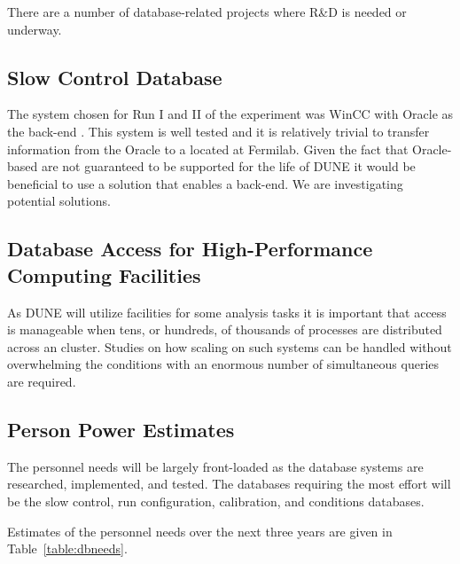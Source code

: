 \documentclass[../main-v1.tex]{subfiles}
\begin{document}
There are a number of database-related projects where R\&D is needed or underway. 

\subsection{Slow Control Database}

The   system chosen for Run I and II of the  experiment was WinCC with Oracle as the back-end . This system is well tested and it is relatively trivial to transfer information from the Oracle  to a   located at Fermilab. Given the fact that Oracle-based  are not guaranteed to be supported for the life of DUNE it would be beneficial to use a solution that enables a  back-end.  We are investigating potential solutions. 

\subsection{Database Access for High-Performance Computing Facilities}

As DUNE will utilize    facilities for some analysis tasks it is important that  access is manageable when tens, or hundreds, of thousands of processes are distributed across an    cluster. Studies on how scaling on such systems can be handled without overwhelming the conditions  with an enormous number of simultaneous queries are required. %

\subsection{Person Power Estimates}

The personnel needs will be largely front-loaded as the database systems are researched, implemented, and tested. The databases requiring the most effort will be the slow control, run configuration, calibration, and conditions databases.  

Estimates of the personnel needs over the next three years are given in Table~\ref{table:dbneeds}. 
\end{document}
